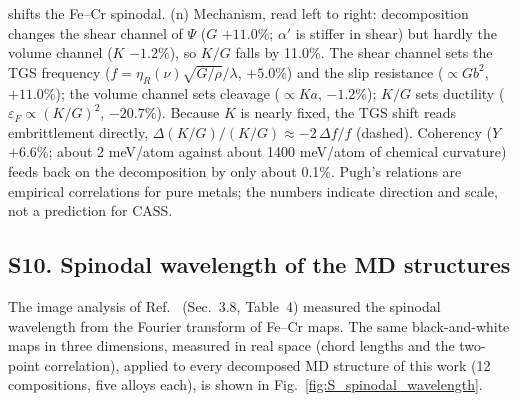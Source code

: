 \documentclass[final,3p,times]{elsarticle}
\begin{document}
shifts the Fe--Cr spinodal. (n) Mechanism, read left to right: decomposition changes the shear channel of $\Psi$ ($G$ $+11.0\%$; $\alpha'$ is stiffer in shear) but hardly the volume channel ($K$ $-1.2\%$), so $K/G$ falls by 11.0\%. The shear channel sets the TGS frequency ($f=\eta_R(\nu)\sqrt{G/\rho}/\lambda$, $+5.0\%$) and the slip resistance ($\propto Gb^2$, $+11.0\%$); the volume channel sets cleavage ($\propto Ka$, $-1.2\%$); $K/G$ sets ductility ($\varepsilon_F\propto(K/G)^2$, $-20.7\%$). Because $K$ is nearly fixed, the TGS shift reads embrittlement directly, $\Delta(K/G)/(K/G)\approx-2\,\Delta f/f$ (dashed). Coherency ($Y$ $+6.6\%$; about 2 meV/atom against about 1400 meV/atom of chemical curvature) feeds back on the decomposition by only about 0.1\%. Pugh's relations are empirical correlations for pure metals; the numbers indicate direction and scale, not a prediction for CASS.
\clearpage

\subsection*{S10. Spinodal wavelength of the MD structures}
The image analysis of Ref.~\cite{al2023detecting} (Sec.~3.8, Table~4) measured the spinodal wavelength from the Fourier transform of Fe--Cr maps. The same black-and-white maps in three dimensions, measured in real space (chord lengths and the two-point correlation), applied to every decomposed MD structure of this work (12 compositions, five alloys each), is shown in Fig.~\ref{fig:S_spinodal_wavelength}.
\end{document}
